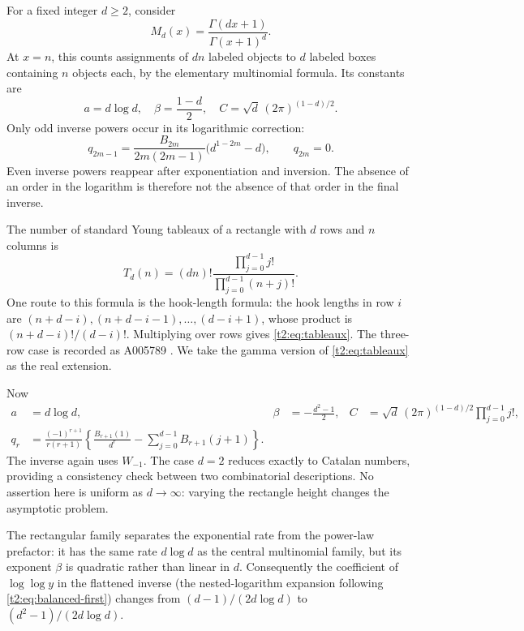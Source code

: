 \documentclass[11pt,openany]{book}
\numberwithin{equation}{chapter}
\theoremstyle{plain}
\theoremstyle{definition}
\theoremstyle{remark}
\begin{document}
For a fixed integer $d\ge2$, consider
\begin{equation}
 M_d(x)=\frac{\Gamma(dx+1)}{\Gamma(x+1)^d}.
 \label{t2:eq:multinomial}
\end{equation}
At $x=n$, this counts assignments of $dn$ labeled objects to $d$ labeled boxes containing $n$ objects each, by the elementary multinomial formula. Its constants are
\begin{equation}
 a=d\log d,\quad \beta=\frac{1-d}{2},\quad
 C=\sqrt d\,(2\pi)^{(1-d)/2}.
 \label{t2:eq:multi-constants}
\end{equation}
Only odd inverse powers occur in its logarithmic correction:
\begin{equation}
 q_{2m-1}=\frac{B_{2m}}{2m(2m-1)}
                 \bigl(d^{1-2m}-d\bigr),\qquad q_{2m}=0.
 \label{t2:eq:multi-q}
\end{equation}
Even inverse powers reappear after exponentiation and inversion. The absence of an order in the logarithm is therefore not the absence of that order in the final inverse.

The number of standard Young tableaux of a rectangle with $d$ rows and $n$ columns is
\begin{equation}
 T_d(n)=(dn)!\frac{\prod_{j=0}^{d-1}j!}{\prod_{j=0}^{d-1}(n+j)!}.
 \label{t2:eq:tableaux}
\end{equation}
One route to this formula is the hook-length formula: the hook lengths in row $i$ are $(n+d-i),(n+d-i-1),\ldots,(d-i+1)$, whose product is $(n+d-i)!/(d-i)!$. Multiplying over rows gives \eqref{t2:eq:tableaux}. The three-row case is recorded as A005789 \cite{oeistableaux}. We take the gamma version of \eqref{t2:eq:tableaux} as the real extension.

Now
\begin{align}
 a&=d\log d,&
 \beta&=-\frac{d^2-1}{2},&
 C&=\sqrt d\,(2\pi)^{(1-d)/2}\prod_{j=0}^{d-1}j!,
 \label{t2:eq:tableaux-constants}\\
 q_r&=\frac{(-1)^{r+1}}{r(r+1)}
 \left\{\frac{B_{r+1}(1)}{d^r}
             -\sum_{j=0}^{d-1}B_{r+1}(j+1)\right\}.
 \label{t2:eq:tableaux-q}
\end{align}
The inverse again uses $W_{-1}$. The case $d=2$ reduces exactly to Catalan numbers, providing a consistency check between two combinatorial descriptions. No assertion here is uniform as $d\to\infty$: varying the rectangle height changes the asymptotic problem.

The rectangular family separates the exponential rate from the power-law
prefactor: it has the same rate $d\log d$ as the central multinomial family,
but its exponent $\beta$ is quadratic rather than linear in $d$.
Consequently the coefficient of $\log\log y$ in the flattened inverse
(the nested-logarithm expansion following \cref{t2:eq:balanced-first})
changes from $(d-1)/(2d\log d)$ to $(d^2-1)/(2d\log d)$.
\end{document}
